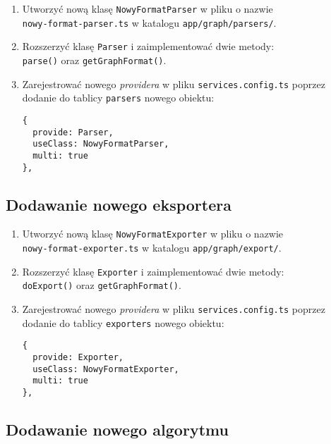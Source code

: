 \begin{enumerate}
\setlength\itemsep{0em}
\item Utworzyć nową klasę \texttt{NowyFormatParser} w pliku o nazwie \\ \texttt{nowy-format-parser.ts} w katalogu \texttt{app/graph/parsers/}.

\item Rozszerzyć klasę \texttt{Parser} i zaimplementować dwie metody: \\ \texttt{parse()} oraz \texttt{getGraphFormat()}.

\item Zarejestrować nowego \textit{providera} w pliku \texttt{services.config.ts} poprzez dodanie do tablicy \texttt{parsers} nowego obiektu:
\begin{verbatim}
{
  provide: Parser, 
  useClass: NowyFormatParser, 
  multi: true
},
\end{verbatim}
\end{enumerate}

\smallskip 

\subsection*{Dodawanie nowego eksportera}

\begin{enumerate}
\setlength\itemsep{0em}
\item Utworzyć nową klasę \texttt{NowyFormatExporter} w pliku o nazwie \\ \texttt{nowy-format-exporter.ts} w katalogu \texttt{app/graph/export/}.

\item Rozszerzyć klasę \texttt{Exporter} i zaimplementować dwie metody: \\ \texttt{doExport()} oraz \texttt{getGraphFormat()}.

\item Zarejestrować nowego \textit{providera} w pliku \texttt{services.config.ts} poprzez dodanie do tablicy \texttt{exporters} nowego obiektu:
\begin{verbatim}
{
  provide: Exporter, 
  useClass: NowyFormatExporter, 
  multi: true
},
\end{verbatim}
\end{enumerate}

\smallskip 

\subsection*{Dodawanie nowego algorytmu}

